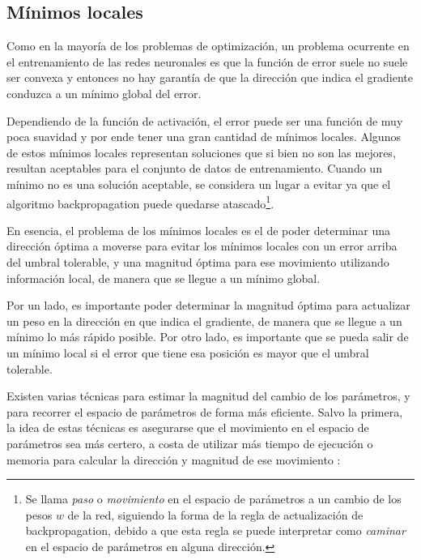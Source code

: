 \subsection{Mínimos locales}

Como en la mayoría de los problemas de optimización, un problema ocurrente en el entrenamiento de las redes neuronales es que la función de error suele no suele ser convexa y entonces no hay garantía de que la dirección que indica el gradiente conduzca a un mínimo global del error.

Dependiendo de la función de activación, el error puede ser una función de muy poca suavidad y por ende tener una gran cantidad de mínimos locales. Algunos de estos mínimos locales representan soluciones que si bien no son las mejores, resultan aceptables para el conjunto de datos de entrenamiento. Cuando un mínimo no es una solución aceptable, se considera un lugar a evitar ya que el algoritmo backpropagation puede quedarse atascado\footnote{Se llama \textit{paso} o \textit{movimiento} en el espacio de parámetros a un cambio de los pesos $w$ de la red, siguiendo la forma de la regla de actualización de backpropagation, debido a que esta regla se puede interpretar como \textit{caminar} en el espacio de parámetros en alguna dirección.}. 

En esencia, el problema de los mínimos locales es el de poder determinar una dirección óptima a moverse para evitar los mínimos locales con un error arriba del umbral tolerable, y una magnitud óptima para ese movimiento utilizando información local, de manera que se llegue a un mínimo global. 

Por un lado, es importante poder determinar la magnitud óptima para actualizar un peso en la dirección en que indica el gradiente, de manera que se llegue a un mínimo lo más rápido posible. Por otro lado, es importante que se pueda salir de un mínimo local si el error que tiene esa posición es mayor que el umbral tolerable. 

Existen varias técnicas para estimar la magnitud del cambio de los parámetros, y para recorrer el espacio de parámetros de forma más eficiente. Salvo la primera, la idea de estas técnicas es asegurarse que el movimiento en el espacio de parámetros sea más certero, a costa de utilizar más tiempo de ejecución o memoria para calcular la dirección y magnitud de ese movimiento \cite{lecun1998,haykin1994}:

